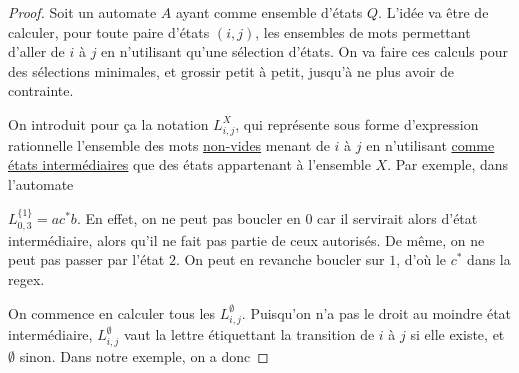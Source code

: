\begin{proof}
Soit un automate $A$ ayant comme ensemble d'états $Q$. L'idée va être de calculer, pour toute paire d'états $(i,j)$, les ensembles de mots permettant d'aller de $i$ à $j$ en n'utilisant qu'une sélection d'états. On va faire ces calculs pour des sélections minimales, et grossir petit à petit, jusqu'à ne plus avoir de contrainte. 


On introduit pour ça la notation $L_{i,j}^X$, qui représente sous forme d'expression rationnelle l'ensemble des mots \underline{non-vides} menant de $i$ à $j$ en n'utilisant \underline{comme états intermédiaires} que des états appartenant à l'ensemble $X$. Par exemple, dans l'automate  

\begin{figure}[H]
\centering
{}
\end{figure}

$L_{0,3}^{\{1\}} = ac^*b$. En effet, on ne peut pas boucler en $0$ car il servirait alors d'état intermédiaire, alors qu'il ne fait pas partie de ceux autorisés. De même, on ne peut pas passer par l'état $2$. On peut en revanche boucler sur $1$, d'où le $c^*$ dans la regex.

On commence en calculer tous les $L_{i,j}^{\emptyset}$. Puisqu'on n'a pas le droit au moindre état intermédiaire, $L_{i,j}^{\emptyset}$ vaut la lettre étiquettant la transition de $i$ à $j$ si elle existe, et $\emptyset$ sinon. Dans notre exemple, on a donc 


\end{proof}
